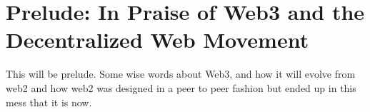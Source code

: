 \chapter*{Prelude: In Praise of Web3 and the Decentralized Web Movement}

This will be prelude. Some wise words about Web3, and how it will evolve from web2 and how web2 was
designed in a peer to peer fashion but ended up in this mess that it is now.
